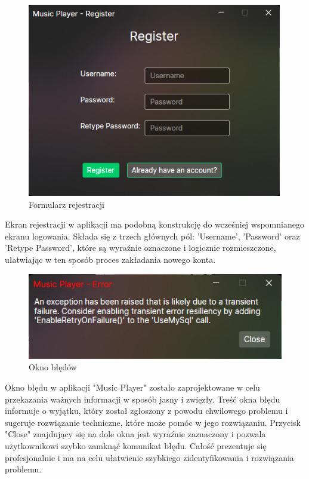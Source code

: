 \begin{figure}[!ht]
	\begin{center}
	\includegraphics[height=240pt]{figures/register.png}
        \caption{{\footnotesize Formularz rejestracji}}
	\end{center}
\end{figure}

{Ekran rejestracji w aplikacji ma podobną konstrukcję do wcześniej wspomnianego ekranu logowania. Składa się z trzech głównych pól: 'Username', 'Password' oraz 'Retype Password', które są wyraźnie oznaczone i logicznie rozmieszczone, ułatwiając w ten sposób proces zakładania nowego konta. }

\begin{figure}[!ht]
	\begin{center}
	\includegraphics[]{figures/error_box.png}
        \caption{{\footnotesize Okno błędów}}
	\end{center}
\end{figure}

{
Okno błędu w aplikacji "Music Player" zostało zaprojektowane w celu przekazania ważnych informacji w sposób jasny i zwięzły. Treść okna błędu informuje o wyjątku, który został zgłoszony z powodu chwilowego problemu i sugeruje rozwiązanie techniczne, które może pomóc w jego rozwiązaniu.
Przycisk "Close" znajdujący się na dole okna jest wyraźnie zaznaczony i pozwala użytkownikowi szybko zamknąć komunikat błędu. Całość prezentuje się profesjonalnie i ma na celu ułatwienie szybkiego zidentyfikowania i rozwiązania problemu.
}

